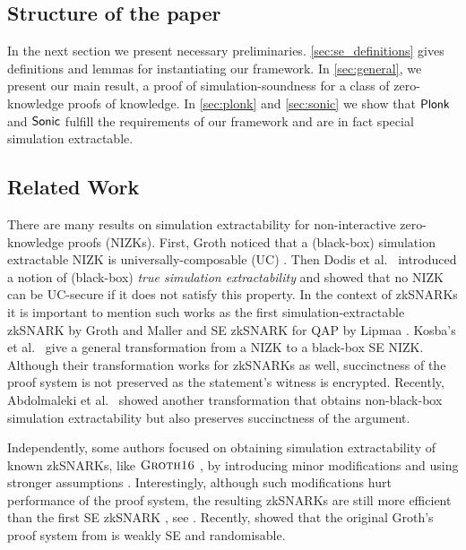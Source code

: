 \documentclass[runningheads,11pt]{llncs}
\begin{document}



\subsection{Structure of the paper}
In the next section we present necessary preliminaries. \cref{sec:se_definitions} gives definitions and lemmas for instantiating our framework. In \cref{sec:general}, we
present our main result, a proof of simulation-soundness for a class of
zero-knowledge proofs of knowledge. In \cref{sec:plonk} and \cref{sec:sonic} we show
that $\textnormal{\textsf{Plonk}}$ and ${\textnormal{\textsf{Sonic}}}$ fulfill the requirements of our framework and are in fact special simulation extractable.

\subsection{Related Work}
There are many results on simulation extractability for non-interactive
zero-knowledge proofs (NIZKs). First, Groth \cite{AC:Groth07} noticed that a
(black-box) simulation extractable NIZK is universally-composable (UC)
\cite{EPRINT:Canetti00}. Then Dodis et al.~\cite{AC:DHLW10} introduced a notion
of (black-box) \emph{true simulation extractability} and showed that no NIZK can
be UC-secure if it does not satisfy this property. In the context of zkSNARKs it is
important to mention such works as the first simulation-extractable zkSNARK by
Groth and Maller \cite{C:GroMal17} and SE zkSNARK for QAP by Lipmaa
\cite{EPRINT:Lipmaa19b}. Kosba's et al.~\cite{EPRINT:KZMQCP15} give a general
transformation from a NIZK to a black-box SE NIZK. Although their transformation
works for zkSNARKs as well, succinctness of the proof system is not preserved as
the statement's witness is encrypted. Recently, Abdolmaleki et
al.~\cite{CCS:AbdRamSla20} showed another transformation that obtains
non-black-box simulation extractability but also preserves succinctness of the
argument.

Independently, some authors focused on obtaining simulation extractability of
known zkSNARKs, like $\textsc{Groth16}$ \cite{EC:Groth16}, by introducing minor
modifications and using stronger assumptions
\cite{EPRINT:BowGab18,EPRINT:AtaBag19}. Interestingly, although such
modifications hurt performance of the proof system, the resulting zkSNARKs are
still more efficient than the first SE zkSNARK \cite{C:GroMal17}, see
\cite{EPRINT:AtaBag19}. Recently, \cite{EPRINT:BKSV20} showed that the original
Groth's proof system from \cite{EC:Groth16} is weakly SE and randomisable.
\end{document}
